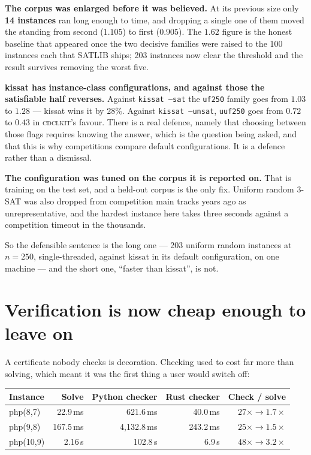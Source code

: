 \documentclass[11pt,a4paper]{article}
\newcommand{\cdclkit}{\textsc{cdclkit}}
\begin{document}
\textbf{The corpus was enlarged before it was believed.} At its previous size
only \textbf{14 instances} ran long enough to time, and dropping a single one
of them moved the standing from second ($1.105$) to first ($0.905$). The
$1.62$ figure is the honest baseline that appeared once the two decisive
families were raised to the 100 instances each that SATLIB ships; 203 instances
now clear the threshold and the result survives removing the worst five.

\textbf{kissat has instance-class configurations, and against those the
satisfiable half reverses.} Against \texttt{kissat --sat} the \texttt{uf250}
family goes from $1.03$ to $\mathbf{1.28}$ --- kissat wins it by 28\%. Against
\texttt{kissat --unsat}, \texttt{uuf250} goes from $0.72$ to $0.43$ in
\cdclkit{}'s favour. There is a real defence, namely that choosing between those
flags requires knowing the answer, which is the question being asked, and that
this is why competitions compare default configurations. It is a defence rather
than a dismissal.

\textbf{The configuration was tuned on the corpus it is reported on.} That is
training on the test set, and a held-out corpus is the only fix. Uniform random
3-SAT was also dropped from competition main tracks years ago as
unrepresentative, and the hardest instance here takes three seconds against a
competition timeout in the thousands.

So the defensible sentence is the long one --- 203 uniform random instances at
$n=250$, single-threaded, against kissat in its default configuration, on one
machine --- and the short one, ``faster than kissat'', is not.

\section{Verification is now cheap enough to leave on}
\label{sec:check}

A certificate nobody checks is decoration. Checking used to cost far more than
solving, which meant it was the first thing a user would switch off:

\begin{table}[h]
\centering
\begin{tabular}{lrrrr}
\toprule
Instance & Solve & Python checker & Rust checker & Check / solve \\
\midrule
php(8,7)  & 22.9\,ms & 621.6\,ms & 40.0\,ms & $27\times \to \mathbf{1.7\times}$ \\
php(9,8)  & 167.5\,ms & 4{,}132.8\,ms & 243.2\,ms & $25\times \to \mathbf{1.5\times}$ \\
php(10,9) & 2.16\,s & 102.8\,s & 6.9\,s & $48\times \to \mathbf{3.2\times}$ \\
\bottomrule
\end{tabular}
\end{table}
\end{document}
